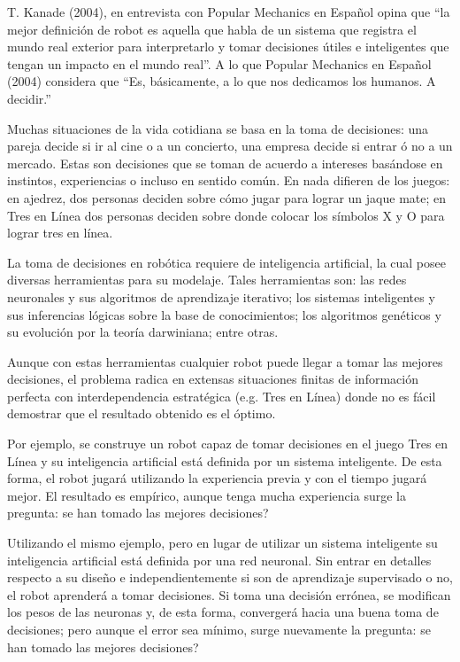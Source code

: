

 T. Kanade (2004), en entrevista con Popular Mechanics en Español opina que 
\textquotedblleft la mejor definición de robot es aquella que habla de un sistema que registra el 
mundo real exterior para interpretarlo y tomar decisiones útiles e inteligentes que 
tengan un impacto en el mundo real\textquotedblright. A lo que Popular Mechanics en Español (2004) 
considera que \textquotedblleft Es, básicamente, a lo que nos dedicamos los humanos. A decidir.\textquotedblright 	{}
	
 Muchas situaciones de la vida cotidiana se basa en la toma de decisiones: una 
pareja decide si ir al cine o a un concierto, una empresa decide si entrar ó no a un 
mercado. Estas son decisiones que se toman de acuerdo a intereses basándose en 
instintos, experiencias o incluso en sentido común. En nada difieren de los juegos: en 
ajedrez, dos personas deciden sobre cómo jugar para lograr un jaque mate; en Tres en 
Línea dos personas deciden sobre donde colocar los símbolos X y O para lograr tres 
en línea. 

 La toma de decisiones en robótica requiere de inteligencia artificial, la cual 
posee diversas herramientas para su modelaje. Tales herramientas son: las redes 
neuronales y sus algoritmos de aprendizaje iterativo; los sistemas inteligentes y sus 
inferencias lógicas sobre la base de conocimientos; los algoritmos genéticos y su 
evolución por la teoría darwiniana; entre otras. 

 Aunque con estas herramientas cualquier robot puede llegar a tomar las 
mejores decisiones, el problema radica en extensas situaciones finitas de información 
perfecta con interdependencia estratégica (e.g. Tres en Línea) donde no es fácil 
demostrar que el resultado obtenido es el óptimo. 

 Por ejemplo, se construye un robot capaz de tomar decisiones en el juego Tres 
en Línea y su inteligencia artificial está definida por un sistema inteligente. De esta 
forma, el robot jugará utilizando la experiencia previa y con el tiempo jugará mejor. 
El resultado es empírico, aunque tenga mucha experiencia surge la pregunta: se han 
tomado las mejores decisiones? 

 Utilizando el mismo ejemplo, pero en lugar de utilizar un sistema inteligente 
su inteligencia artificial está definida por una red neuronal. Sin entrar en detalles 
respecto a su diseño e independientemente si son de aprendizaje supervisado o no, el 
robot aprenderá a tomar decisiones. Si toma una decisión errónea, se modifican los 
pesos de las neuronas y, de esta forma, convergerá hacia una buena toma de 
decisiones; pero aunque el error sea mínimo, surge nuevamente la pregunta: se han 
tomado las mejores decisiones? 

